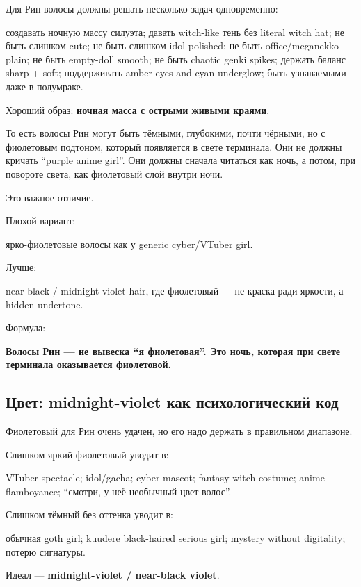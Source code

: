 Для Рин волосы должны решать несколько задач одновременно:

создавать ночную массу силуэта; давать witch-like тень без literal witch
hat; не быть слишком cute; не быть слишком idol-polished; не быть
office/\hspace{0pt}meganekko plain; не быть empty-doll smooth; не быть chaotic genki
spikes; держать баланс sharp + soft; поддерживать amber eyes and cyan
underglow; быть узнаваемыми даже в полумраке.

Хороший образ: \textbf{ночная масса с острыми живыми краями}.

То есть волосы Рин могут быть тёмными, глубокими, почти чёрными, но с
фиолетовым подтоном, который появляется в свете терминала. Они не должны
кричать ``purple anime girl''. Они должны сначала читаться как ночь, а
потом, при повороте света, как фиолетовый слой внутри ночи.

Это важное отличие.

Плохой вариант:

ярко-фиолетовые волосы как у generic cyber/\hspace{0pt}VTuber girl.

Лучше:

near-black /\hspace{0pt} midnight-violet hair, где фиолетовый --- не краска ради
яркости, а hidden undertone.

Формула:

\textbf{Волосы Рин --- не вывеска ``я фиолетовая''. Это ночь, которая
при свете терминала оказывается фиолетовой.}

\subsection*{Цвет: midnight-violet как психологический код}

Фиолетовый для Рин очень удачен, но его надо держать в правильном
диапазоне.

Слишком яркий фиолетовый уводит в:

VTuber spectacle; idol/\hspace{0pt}gacha; cyber mascot; fantasy witch costume; anime
flamboyance; ``смотри, у неё необычный цвет волос''.

Слишком тёмный без оттенка уводит в:

обычная goth girl; kuudere black-haired serious girl; mystery without
digitality; потерю сигнатуры.

Идеал --- \textbf{midnight-violet /\hspace{0pt} near-black violet}.

